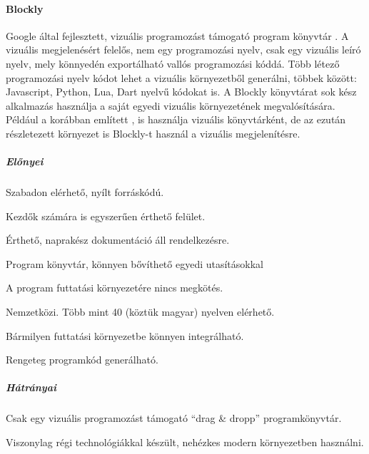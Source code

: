 \documentclass[12pt,a4paper,oneside]{report} %
\begin{document}
\paragraph{Blockly}
\label{blocly}
Google által fejlesztett, vizuális programozást támogató program könyvtár \cite{BlocklyUrl2020Feb} \cite{pasternak2017tips}. A vizuális megjelenésért felelős, nem egy programozási nyelv, csak egy vizuális leíró nyelv, mely könnyedén exportálható vallós programozási kóddá. Több létező programozási nyelv kódot lehet a vizuális környezetből generálni, többek között: Javascript, Python, Lua, Dart nyelvű kódokat is. A Blockly könyvtárat sok kész alkalmazás használja a saját egyedi vizuális környezetének megvalósítására.
Például a korábban említett ,  is használja vizuális könyvtárként, de az ezután részletezett  környezet is Blockly-t használ a vizuális megjelenítésre.
\subparagraph{Előnyei} 
\begin{compactitem}
	\item Szabadon elérhető, nyílt forráskódú.
	\item Kezdők számára is egyszerűen érthető felület.
	\item Érthető, naprakész dokumentáció áll rendelkezésre.
	\item Program könyvtár, könnyen bővíthető egyedi utasításokkal
	\item A program futtatási környezetére nincs megkötés.
	\item Nemzetközi. Több mint 40 (köztük magyar) nyelven elérhető.
	\item Bármilyen futtatási környezetbe könnyen integrálható.
	\item Rengeteg programkód generálható.
\end{compactitem}
\subparagraph{Hátrányai} 
\begin{compactitem}
	\item Csak egy vizuális programozást támogató  ``drag \& dropp'' programkönyvtár.
	\item Viszonylag régi technológiákkal készült, nehézkes modern környezetben használni.
\end{compactitem}
\end{document}
